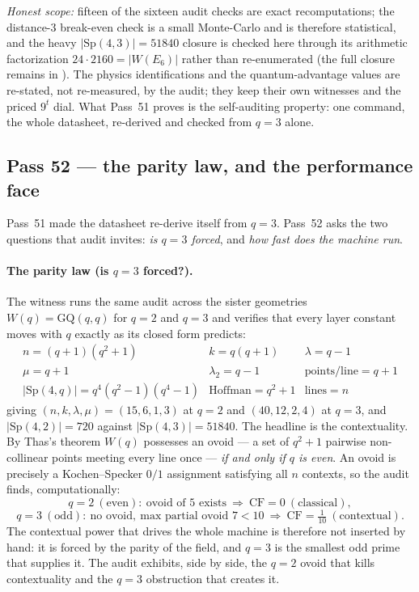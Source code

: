 \documentclass[11pt]{article}
\begin{document}
\emph{Honest scope:} fifteen of the sixteen audit checks are exact
recomputations; the distance-\(3\) break-even check is a small Monte-Carlo and is
therefore statistical, and the heavy \(|\mathrm{Sp}(4,3)|=51840\) closure is
checked here through its arithmetic factorization \(24\cdot2160=|W(E_6)|\) rather
than re-enumerated (the full closure remains in ).
The physics identifications and the quantum-advantage values are re-stated, not
re-measured, by the audit; they keep their own witnesses and the priced \(9^t\)
dial.  What Pass~51 proves is the self-auditing property: one command, the whole
datasheet, re-derived and checked from \(q=3\) alone.

\subsection{Pass 52 --- the parity law, and the performance face}
\label{sec:capstone-fiftytwo}

Pass~51 made the datasheet re-derive itself from \(q=3\).  Pass~52 asks the two
questions that audit invites: \emph{is \(q=3\) forced}, and \emph{how fast does
the machine run}.

\paragraph{The parity law (is \(q=3\) forced?).}  The witness
 runs the same audit across the sister
geometries \(W(q)=\mathrm{GQ}(q,q)\) for \(q=2\) and \(q=3\) and verifies that
every layer constant moves with \(q\) exactly as its closed form predicts:
\[
\begin{array}{lll}
n=(q+1)(q^2+1) & k=q(q+1) & \lambda=q-1\\
\mu=q+1 & \lambda_2=q-1 & \text{points/line}=q+1\\
|\mathrm{Sp}(4,q)|=q^4(q^2-1)(q^4-1) & \text{Hoffman}=q^2+1 & \text{lines}=n
\end{array}
\]
giving \((n,k,\lambda,\mu)=(15,6,1,3)\) at \(q=2\) and \((40,12,2,4)\) at
\(q=3\), and \(|\mathrm{Sp}(4,2)|=720\) against \(|\mathrm{Sp}(4,3)|=51840\).
The headline is the contextuality.  By Thas's theorem \(W(q)\) possesses an
ovoid --- a set of \(q^2+1\) pairwise non-collinear points meeting every line
once --- \emph{if and only if \(q\) is even}.  An ovoid is precisely a
Kochen--Specker \(0/1\) assignment satisfying all \(n\) contexts, so the audit
finds, computationally:
\[
  q=2\ (\text{even}):\ \text{ovoid of }5\text{ exists}\ \Rightarrow\ \mathrm{CF}=0\ (\text{classical}),
\]
\[
  q=3\ (\text{odd}):\ \text{no ovoid},\ \text{max partial ovoid }7<10\ \Rightarrow\ \mathrm{CF}=\tfrac1{10}\ (\text{contextual}).
\]
The contextual power that drives the whole machine is therefore not inserted by
hand: it is forced by the parity of the field, and \(q=3\) is the smallest odd
prime that supplies it.  The audit exhibits, side by side, the \(q=2\) ovoid that
kills contextuality and the \(q=3\) obstruction that creates it.
\end{document}
